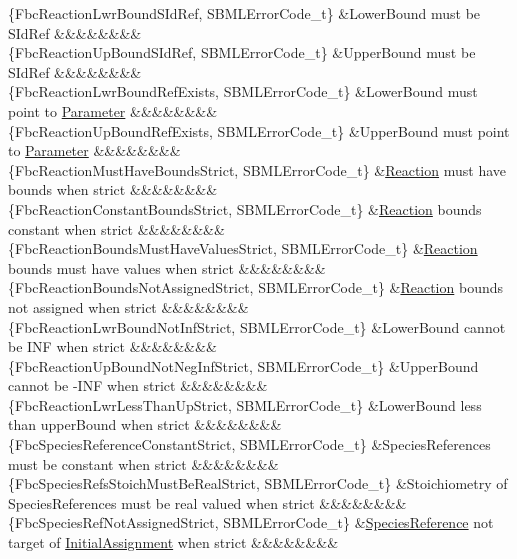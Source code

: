 \begin{DoxyParagraph}{}
\begin{longtabu}
\{Fbc\+Reaction\+Lwr\+Bound\+S\+Id\+Ref, S\+B\+M\+L\+Error\+Code\+\_\+t\} &Lower\+Bound must be S\+Id\+Ref &&&&&&&&\\
\{Fbc\+Reaction\+Up\+Bound\+S\+Id\+Ref, S\+B\+M\+L\+Error\+Code\+\_\+t\} &Upper\+Bound must be S\+Id\+Ref &&&&&&&&\\
\{Fbc\+Reaction\+Lwr\+Bound\+Ref\+Exists, S\+B\+M\+L\+Error\+Code\+\_\+t\} &Lower\+Bound must point to \hyperlink{class_parameter}{Parameter} &&&&&&&&\\
\{Fbc\+Reaction\+Up\+Bound\+Ref\+Exists, S\+B\+M\+L\+Error\+Code\+\_\+t\} &Upper\+Bound must point to \hyperlink{class_parameter}{Parameter} &&&&&&&&\\
\{Fbc\+Reaction\+Must\+Have\+Bounds\+Strict, S\+B\+M\+L\+Error\+Code\+\_\+t\} &\hyperlink{class_reaction}{Reaction} must have bounds when strict &&&&&&&&\\
\{Fbc\+Reaction\+Constant\+Bounds\+Strict, S\+B\+M\+L\+Error\+Code\+\_\+t\} &\hyperlink{class_reaction}{Reaction} bounds constant when strict &&&&&&&&\\
\{Fbc\+Reaction\+Bounds\+Must\+Have\+Values\+Strict, S\+B\+M\+L\+Error\+Code\+\_\+t\} &\hyperlink{class_reaction}{Reaction} bounds must have values when strict &&&&&&&&\\
\{Fbc\+Reaction\+Bounds\+Not\+Assigned\+Strict, S\+B\+M\+L\+Error\+Code\+\_\+t\} &\hyperlink{class_reaction}{Reaction} bounds not assigned when strict &&&&&&&&\\
\{Fbc\+Reaction\+Lwr\+Bound\+Not\+Inf\+Strict, S\+B\+M\+L\+Error\+Code\+\_\+t\} &Lower\+Bound cannot be I\+NF when strict &&&&&&&&\\
\{Fbc\+Reaction\+Up\+Bound\+Not\+Neg\+Inf\+Strict, S\+B\+M\+L\+Error\+Code\+\_\+t\} &Upper\+Bound cannot be -\/\+I\+NF when strict &&&&&&&&\\
\{Fbc\+Reaction\+Lwr\+Less\+Than\+Up\+Strict, S\+B\+M\+L\+Error\+Code\+\_\+t\} &Lower\+Bound less than upper\+Bound when strict &&&&&&&&\\
\{Fbc\+Species\+Reference\+Constant\+Strict, S\+B\+M\+L\+Error\+Code\+\_\+t\} &Species\+References must be constant when strict &&&&&&&&\\
\{Fbc\+Species\+Refs\+Stoich\+Must\+Be\+Real\+Strict, S\+B\+M\+L\+Error\+Code\+\_\+t\} &Stoichiometry of Species\+References must be real valued when strict &&&&&&&&\\
\{Fbc\+Species\+Ref\+Not\+Assigned\+Strict, S\+B\+M\+L\+Error\+Code\+\_\+t\} &\hyperlink{class_species_reference}{Species\+Reference} not target of \hyperlink{class_initial_assignment}{Initial\+Assignment} when strict &&&&&&&&\\

\end{longtabu}
\end{DoxyParagraph}
